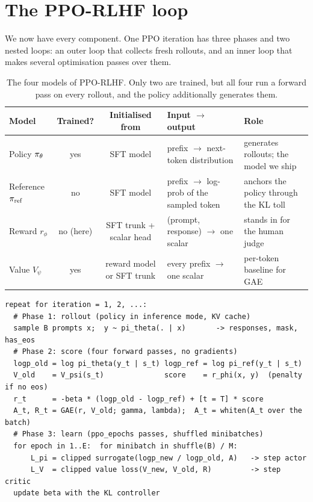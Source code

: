 \section{The PPO-RLHF loop}\label{sec:rlhf:loop}

We now have every component. One PPO iteration has three phases and two nested loops: an outer
loop that collects fresh rollouts, and an inner loop that makes several optimisation passes over them.

\begin{table}[ht]
\centering\small
\begin{tabularx}{\linewidth}{@{}lccXX@{}}
\toprule
\textbf{Model} & \textbf{Trained?} & \textbf{Initialised from} & \textbf{Input $\to$ output} & \textbf{Role}\\
\midrule
Policy $\pi_\theta$ & yes & SFT model & prefix $\to$ next-token distribution & generates rollouts; the model we ship\\
Reference $\pi_{\text{ref}}$ & no & SFT model & prefix $\to$ log-prob of the sampled token & anchors the policy through the KL toll\\
Reward $r_\phi$ & no (here) & SFT trunk + scalar head & (prompt, response) $\to$ one scalar & stands in for the human judge\\
Value $V_\psi$ & yes & reward model or SFT trunk & every prefix $\to$ one scalar & per-token baseline for GAE\\
\bottomrule
\end{tabularx}
\caption{The four models of PPO-RLHF. Only two are trained, but all four run a forward pass on every
rollout, and the policy additionally generates them.}
\label{tab:rlhf:roles}
\end{table}

\begin{lstlisting}[style=plain,caption={One PPO-RLHF iteration in pseudocode.},label={lst:rlhf:pseudo}]
repeat for iteration = 1, 2, ...:
  # Phase 1: rollout (policy in inference mode, KV cache)
  sample B prompts x;  y ~ pi_theta(. | x)       -> responses, mask, has_eos
  # Phase 2: score (four forward passes, no gradients)
  logp_old = log pi_theta(y_t | s_t) logp_ref = log pi_ref(y_t | s_t)
  V_old    = V_psi(s_t)              score    = r_phi(x, y)  (penalty if no eos)
  r_t      = -beta * (logp_old - logp_ref) + [t = T] * score
  A_t, R_t = GAE(r, V_old; gamma, lambda);  A_t = whiten(A_t over the batch)
  # Phase 3: learn (ppo_epochs passes, shuffled minibatches)
  for epoch in 1..E:  for minibatch in shuffle(B) / M:
      L_pi = clipped surrogate(logp_new / logp_old, A)   -> step actor
      L_V  = clipped value loss(V_new, V_old, R)         -> step critic
  update beta with the KL controller
\end{lstlisting}

